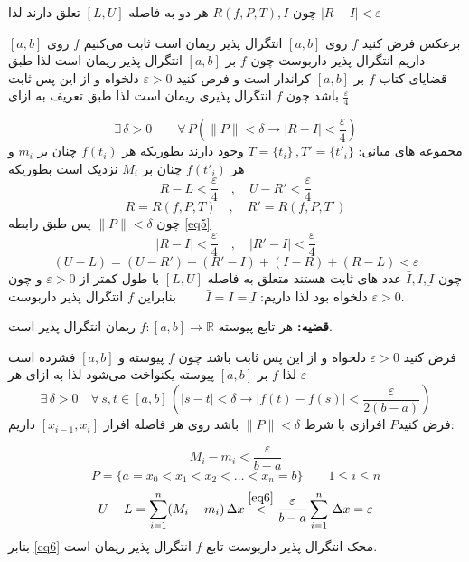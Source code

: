 \documentclass[12pt]{report}
\begin{document}
چون 
$R(f,P,T) , I$
هر دو به فاصله 
$[L , U]$
تعلق دارند لذا 
$|R - I| < \varepsilon$

برعکس فرض کنید 
$f$
روی
$[a,b]$
انتگرال پذیر ریمان است ثابت می‌کنیم
$f$
روی 
$[a, b]$
داریم انتگرال پذیر داربوست چون 
$f$
بر
$[a, b]$
انتگرال پذیر ریمان است لذا طبق قضایای کتاب 
$f$
بر 
$[a, b]$
کراندار است و فرص کنید 
$\varepsilon > 0$
دلخواه و از این پس ثابت باشد چون
$f$
انتگرال پذیری ریمان است لذا طبق تعریف به ازای
$\frac{\varepsilon}{4}$

\begin{equation}\label{eq5}
	\exists \, \delta > 0 \qquad \forall\,P(\lVert P \rVert < \delta \rightarrow |R - I| < \frac{\varepsilon}{4})
\end{equation}	
مجموعه های میانی:
$ T = \{t_i\} \,,  T'=\{t'_i\}$
وجود دارند بطوریکه هر
$f(t_i)$
چنان بر 
$m_i$
و هر
$f(t'_i)$
چنان بر 
$M_i$
نزدیک است بطوریکه
\[
R - L < \frac{\varepsilon}{4} \quad , \quad U - R' <\frac{\varepsilon}{4}
\]
\[
R = R(f, P, T) \quad , \quad R' = R(f, P, T')
\]
چون 
$\lVert P \rVert < \delta$
پس طبق رابطه
\ref{eq5}
\[
|R - I| <\frac{\varepsilon}{4} \quad , \quad |R' - I| < \frac{\varepsilon}{4}
\]
\[
(U - L) = (U - R') + (R' - I) + (I - R) + (R - L) < \varepsilon
\]
چون
$\bar{I} ,  I, \underbar{I}$
عدد های ثابت هستند متعلق به فاصله   
$[L , U]$
با طول کمتر از 
$\varepsilon > 0$
و چون 
$\varepsilon >0$
دلخواه بود لذا داریم:
$\qquad  \bar{I} =  I= \underbar{I}$
بنابراین 
$f$
انتگرال پذیر داربوست.

\textbf{قضیه:}
هر تابع پیوسته
$f:[a, b]\rightarrow \mathbb{R}$
ریمان انتگرال پذیر است.

فرض کنید
$\varepsilon > 0$
دلخواه و از این پس ثابت باشد چون 
$f$
پیوسته و
$[a, b]$
فشرده است لذا 
$f$
بر
$[a, b]$
پیوسته یکنواخت می‌شود لذا به ازای هر
$\varepsilon$
\begin{equation}\label{eq6}
	\exists\, \delta > 0 \quad \forall \,s, t \in[a, b]\,(|s- t| < \delta \rightarrow |f(t) - f(s)| < \frac{\varepsilon}{2(b - a)})
\end{equation}
فرض کنید$P$ افرازی با شرط 
$\lVert P \rVert < \delta$
باشد روی هر فاصله افراز
$[x_{i -1}, x_i]$
داریم:

\begin{equation}\label{eq7}
	M_i - m_i < \frac{\varepsilon}{b-a}
\end{equation}
\[
P = \{a = x_0 < x_1 < x_2 <\dots <x_n = b\} \qquad 1 \leq i \leq n
\]
\[
U - L = \sum_{i = 1}^n (M_i - m_i )\, \Delta x \overset{\eqref{eq6}}{<} \frac{\varepsilon}{b-a}
\sum_{i = 1}^n\, \Delta x = \varepsilon
\]
بنابر 
\eqref{eq6}
محک انتگرال پذیر داربوست تابع $f$ انتگرال پذیر ریمان است.
\end{document}
